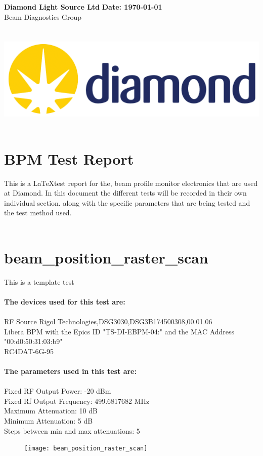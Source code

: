 \documentclass[a4paper, 11pt]{article}%
\begin{document}
%
\normalsize%
\noindent%
\large\textbf{Diamond Light Source Ltd} \hfill\large\textbf{Date: \today}%
\\\normalsize Beam Diagnostics Group \hfill\\%
\\\\\includegraphics[width = 1\textwidth]{./Latex_Report/Logo.PNG}\\\\%
\section*{BPM Test Report}%
This is a \LaTeX test report for the, beam profile monitor electronics that are used at Diamond. In this document the different tests will be recorded in their own individual section. along with the specific parameters that are being tested and the test method used.\\\\%
\clearpage%
\tableofcontents%
\listoffigures%
\clearpage%
\section{beam\_position\_raster\_scan}%
This is a template test\\\\%
\textbf{The devices used for this test are:}\\\\%
RF Source Rigol Technologies,DSG3030,DSG3B174500308,00.01.06\\%
Libera BPM with the Epics ID "TS-DI-EBPM-04:" and the MAC Address "00:d0:50:31:03:b9"\\%
RC4DAT-6G-95\\%
\\%
\textbf{The parameters used in this test are:}\\\\%
Fixed RF Output Power: -20 dBm\\%
Fixed Rf Output Frequency: 499.6817682 MHz\\%
Maximum Attenuation: 10 dB\\%
Minimum Attenuation: 5 dB\\%
Steps between min and max attenuations: 5\\

%


\begin{figure}[htbp]%
\centering%
\texttt{[image: beam\_position\_raster\_scan]}%
\caption{}%
\end{figure}

%
\end{document}
